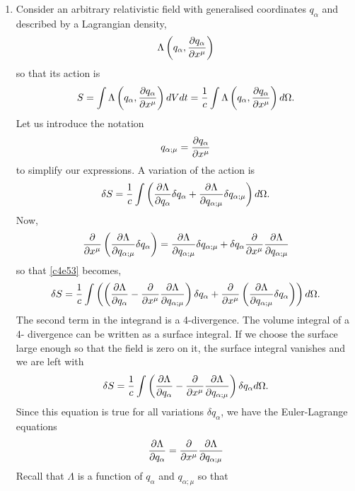 \begin{enumerate}
\item Consider an arbitrary relativistic field with generalised coordinates 
$q_\alpha$ and described by a Lagrangian density,
\[
\Lambda\left(q_\alpha, \frac{\partial{q_\alpha}}{\partial{x^\mu}}\right)
\]
so that its action is
\begin{equation}\label{c4e51}
S = \int \Lambda\left(q_\alpha, \frac{\partial{q_\alpha}}{\partial{x^\mu}}\right)dV dt = \frac{1}{c}
\int\Lambda\left(q_\alpha, \frac{\partial{q_\alpha}}{\partial{x^\mu}}\right)d\Omega.
\end{equation}
Let us introduce the notation
\begin{equation}\label{c4e52}
q_{\alpha; \mu} = \frac{\partial{q_\alpha}}{\partial{x^\mu}}
\end{equation}
to simplify our expressions. A variation of the action is
\begin{equation}\label{c4e53}
\delta S = \frac{1}{c}\int\left(\frac{\partial{\Lambda}}{\partial{q_\alpha}}\delta q_\alpha +
\frac{\partial{\Lambda}}{\partial{q_{\alpha;\mu}}}\delta q_{\alpha;\mu}\right)d\Omega.
\end{equation}
Now,
\[
\frac{\partial}{\partial x^\mu}\left(\frac{\partial{\Lambda}}{\partial{q_{\alpha;\mu}}} \delta q_\alpha\right) = 
\frac{\partial{\Lambda}}{\partial{q_{\alpha;\mu}}}\delta q_{\alpha;\mu} + \delta q_\alpha\frac{\partial}
{\partial x^\mu}\frac{\partial{\Lambda}}{\partial{q_{\alpha;\mu}}}
\]
so that \eqref{c4e53} becomes,
\begin{equation}\label{c4e54}
\delta S = \frac{1}{c}\int\left(\left(\frac{\partial{\Lambda}}{\partial{q_\alpha}} - \frac{\partial}
{\partial x^\mu}\frac{\partial{\Lambda}}{\partial{q_{\alpha;\mu}}}\right)\delta q_\alpha +
\frac{\partial}{\partial x^\mu}\left(\frac{\partial{\Lambda}}{\partial{q_{\alpha;\mu}}} \delta q_\alpha
\right)\right)d\Omega.
\end{equation}
The second term in the integrand is a 4-divergence. The volume integral of a 4-
divergence can be written as a surface integral. If we choose the surface large 
enough so that the field is zero on it, the surface integral vanishes and we are
left with
\begin{equation}\label{c4e55}
\delta S = \frac{1}{c}\int \left(\frac{\partial{\Lambda}}{\partial{q_\alpha}} - \frac{\partial}
{\partial x^\mu}\frac{\partial{\Lambda}}{\partial{q_{\alpha;\mu}}}\right)\delta q_\alpha d\Omega.
\end{equation}
Since this equation is true for all variations $\delta q_\alpha$, we have the 
Euler-Lagrange equations
\begin{equation}\label{c4e56}
\frac{\partial{\Lambda}}{\partial{q_\alpha}} = \frac{\partial}{\partial x^\mu}\frac{\partial{\Lambda}}{\partial{q_{\alpha;\mu}}}
\end{equation}
Recall that $\Lambda$ is a function of $q_\alpha$ and $q_{\alpha;\mu}$ so that

\end{enumerate}
